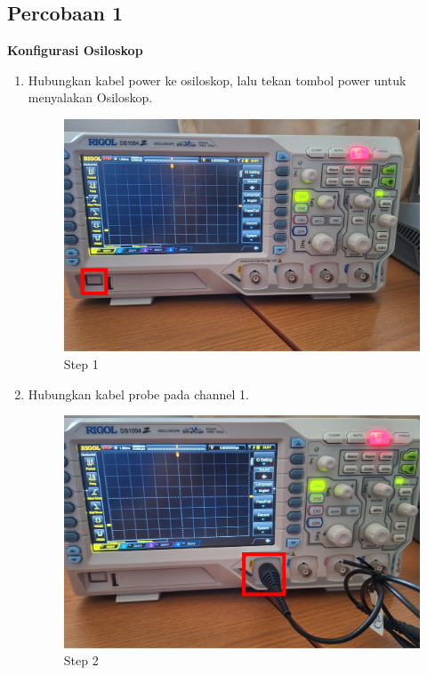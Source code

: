 \subsection{Percobaan 1}
\begin{center}

	\textbf{Konfigurasi Osiloskop}
	\begin{enumerate}
		\item Hubungkan kabel power ke osiloskop, lalu tekan tombol power untuk menyalakan Osiloskop. 
			\begin{figure}[H]
				\centering
				\includegraphics[width=0.8\linewidth]{P1/img/per 1/step 1.png}
				\caption{Step 1}
				\label{fig:Step 1(Group 7)}
			\end{figure}

		\item Hubungkan kabel probe pada channel 1.
			\begin{figure}[H]
				\centering
				\includegraphics[width=0.8\linewidth]{P1/img/per 1/step 2.png}
				\caption{Step 2}
				\label{fig:Step 2(Group 14)}
			\end{figure}


\end{enumerate}
\end{center}
